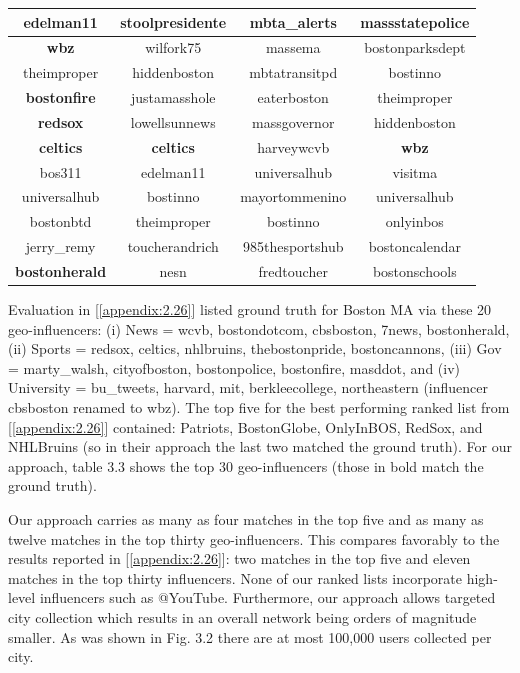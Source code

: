 \begin{table}
\begin{tabular}{|c|c|c|c|}
\hline
edelman11&stoolpresidente&mbta\_alerts&massstatepolice\\
\hline
\bfseries wbz&wilfork75&massema&bostonparksdept\\
\hline
theimproper&hiddenboston&mbtatransitpd&bostinno\\
\hline
\bfseries bostonfire&justamasshole&eaterboston&theimproper\\
\hline
\bfseries redsox&lowellsunnews&massgovernor&hiddenboston\\
\hline
\bfseries celtics&\bfseries celtics&harveywcvb&\bfseries wbz\\
\hline
bos311&edelman11&universalhub&visitma\\
\hline
universalhub&bostinno&mayortommenino&universalhub\\
\hline
bostonbtd&theimproper&bostinno&onlyinbos\\
\hline
jerry\_remy&toucherandrich&985thesportshub&bostoncalendar\\
\hline
\bfseries bostonherald&nesn&fredtoucher&bostonschools\\
\hline
\end{tabular}
\end{table}

Evaluation in [\ref{appendix:2.26}] listed ground truth for Boston MA via these 20 geo-influencers: (i) News = wcvb, bostondotcom, cbsboston, 7news, bostonherald, (ii) Sports = redsox, celtics, nhlbruins, thebostonpride, bostoncannons, (iii) Gov = marty\_walsh, cityofboston, bostonpolice, bostonfire, masddot, and (iv) University = bu\_tweets, harvard, mit, berkleecollege, northeastern (influencer cbsboston renamed to wbz). The top five for the best performing ranked list from [\ref{appendix:2.26}] contained: Patriots, BostonGlobe, OnlyInBOS, RedSox, and NHLBruins (so in their approach the last two matched the ground truth). For our approach, table 3.3 shows the top 30 geo-influencers (those in bold match the ground truth).

Our approach carries as many as four matches in the top five and as many as twelve matches in the top thirty geo-influencers. This compares favorably to the results reported in [\ref{appendix:2.26}]: two matches in the top five and eleven matches in the top thirty influencers. None of our ranked lists incorporate high-level influencers such as @YouTube. Furthermore, our approach allows targeted city collection which results in an overall network being orders of magnitude smaller. As was shown in Fig. 3.2 there are at most 100,000 users collected per city. 


